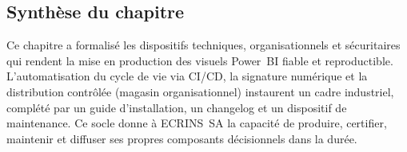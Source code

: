 
\subsection*{Synthèse du chapitre}

Ce chapitre a formalisé les dispositifs techniques, organisationnels et sécuritaires qui rendent la mise en production des visuels Power~BI fiable et reproductible. L’automatisation du cycle de vie via CI/CD, la signature numérique et la distribution contrôlée (magasin organisationnel) instaurent un cadre industriel, complété par un guide d’installation, un changelog et un dispositif de maintenance. Ce socle donne à ECRINS~SA la capacité de produire, certifier, maintenir et diffuser ses propres composants décisionnels dans la durée.
